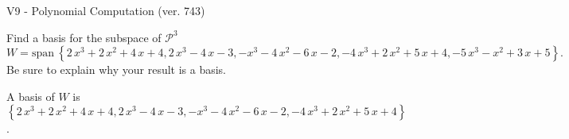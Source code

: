 \begin{exercise}
  \begin{exerciseTitle}V9 - Polynomial Computation (ver. 743)\end{exerciseTitle}
  \begin{exerciseStatement}
    Find a basis for the subspace of \(\mathcal{P}^3\) 
\[W=\mathrm{span}\ \left\{2 \, x^{3} + 2 \, x^{2} + 4 \, x + 4 , 2 \, x^{3} - 4 \, x - 3 , -x^{3} - 4 \, x^{2} - 6 \, x - 2 , -4 \, x^{3} + 2 \, x^{2} + 5 \, x + 4 , -5 \, x^{3} - x^{2} + 3 \, x + 5\right\}.\]
 Be sure to explain why your result is a basis.


  \end{exerciseStatement}
  \begin{exerciseAnswer}
   A basis of \(W\) is  \(\left\{2 \, x^{3} + 2 \, x^{2} + 4 \, x + 4 , 2 \, x^{3} - 4 \, x - 3 , -x^{3} - 4 \, x^{2} - 6 \, x - 2 , -4 \, x^{3} + 2 \, x^{2} + 5 \, x + 4\right\}\).
  


  \end{exerciseAnswer}
\end{exercise}